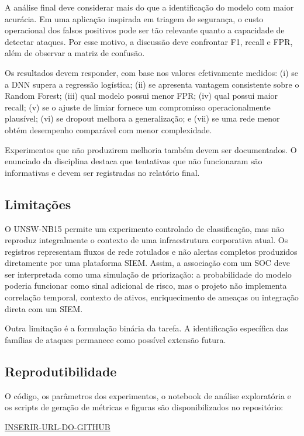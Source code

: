\documentclass[12pt]{article}
\newcommand{\repositoryurl}{\url{INSERIR-URL-DO-GITHUB}}
\begin{document}
A análise final deve considerar mais do que a identificação do modelo com maior acurácia. Em uma aplicação inspirada em triagem de segurança, o custo operacional dos falsos positivos pode ser tão relevante quanto a capacidade de detectar ataques. Por esse motivo, a discussão deve confrontar F1, recall e FPR, além de observar a matriz de confusão.

Os resultados devem responder, com base nos valores efetivamente medidos: (i) se a DNN supera a regressão logística; (ii) se apresenta vantagem consistente sobre o Random Forest; (iii) qual modelo possui menor FPR; (iv) qual possui maior recall; (v) se o ajuste de limiar fornece um compromisso operacionalmente plausível; (vi) se dropout melhora a generalização; e (vii) se uma rede menor obtém desempenho comparável com menor complexidade.

Experimentos que não produzirem melhoria também devem ser documentados. O enunciado da disciplina destaca que tentativas que não funcionaram são informativas e devem ser registradas no relatório final.

\subsection{Limitações}

O UNSW-NB15 permite um experimento controlado de classificação, mas não reproduz integralmente o contexto de uma infraestrutura corporativa atual. Os registros representam fluxos de rede rotulados e não alertas completos produzidos diretamente por uma plataforma SIEM. Assim, a associação com um SOC deve ser interpretada como uma simulação de priorização: a probabilidade do modelo poderia funcionar como sinal adicional de risco, mas o projeto não implementa correlação temporal, contexto de ativos, enriquecimento de ameaças ou integração direta com um SIEM.

Outra limitação é a formulação binária da tarefa. A identificação específica das famílias de ataques permanece como possível extensão futura.

\subsection{Reprodutibilidade}

O código, os parâmetros dos experimentos, o notebook de análise exploratória e os scripts de geração de métricas e figuras são disponibilizados no repositório:

\begin{center}
\repositoryurl
\end{center}
\end{document}
